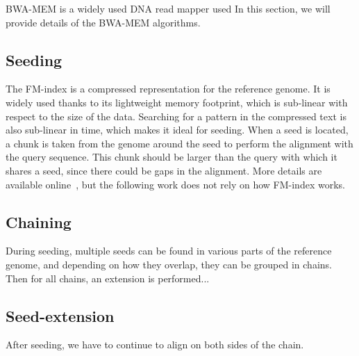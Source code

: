 
BWA-MEM is a widely used DNA read mapper used  In this section, we will provide details of the BWA-MEM algorithms.

\subsection{Seeding}
The FM-index is a compressed representation for the reference genome. It is widely used thanks to its lightweight memory footprint, which is sub-linear with respect to the size of the data. Searching for a pattern in the compressed text is also sub-linear in time, which makes it ideal for seeding. When a seed is located, a chunk is taken from the genome around the seed to perform the alignment with the query sequence. This chunk should be larger than the query with which it shares a seed, since there could be gaps in the alignment. More details are available online~\cite{wiki:FMIndex}, but the following work does not rely on how FM-index works. 
\subsection{Chaining}
During seeding, multiple seeds can be found in various parts of the reference genome, and depending on how they overlap, they can be grouped in chains. Then for all chains, an extension is performed...


\subsection{Seed-extension}
After seeding, we have to continue to align on both sides of the chain. 











